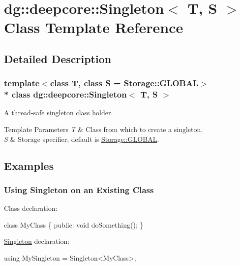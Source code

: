 \hypertarget{classdg_1_1deepcore_1_1_singleton}{}\section{dg\+:\+:deepcore\+:\+:Singleton$<$ T, S $>$ Class Template Reference}
\label{classdg_1_1deepcore_1_1_singleton}


\subsection{Detailed Description}
\subsubsection*{template$<$class T, class S = Storage\+::\+G\+L\+O\+B\+AL$>$\\*
class dg\+::deepcore\+::\+Singleton$<$ T, S $>$}

A thread-\/safe singleton class holder. 


\begin{DoxyTemplParams}{Template Parameters}
{\em T} & Class from which to create a singleton. \\
\hline
{\em S} & Storage specifier, default is \hyperlink{group___utility_module_gga77a5aca6f6f331cac011e7759117ddcba6eecfba72d12922ee1dead07a0ef3334}{Storage\+::\+G\+L\+O\+B\+AL}. \\
\hline
\end{DoxyTemplParams}
\hypertarget{classdg_1_1deepcore_1_1_singleton_examples}{}\subsection{Examples}\label{classdg_1_1deepcore_1_1_singleton_examples}
\hypertarget{classdg_1_1deepcore_1_1_singleton_existing}{}\subsubsection{Using Singleton on an Existing Class}\label{classdg_1_1deepcore_1_1_singleton_existing}
Class declaration\+: 
\begin{DoxyCode}
\textcolor{keyword}{class }MyClass
\{
\textcolor{keyword}{public}:
    \textcolor{keywordtype}{void} doSomething();
\}
\end{DoxyCode}


\hyperlink{classdg_1_1deepcore_1_1_singleton}{Singleton} declaration\+: 
\begin{DoxyCode}
\textcolor{keyword}{using} MySingleton = Singleton<MyClass>;
\end{DoxyCode}


